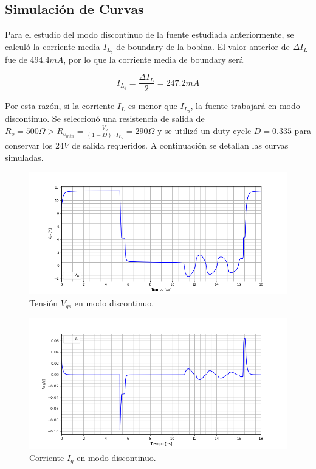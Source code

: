 %

%

\subsection{Simulación de Curvas}

Para el estudio del modo discontinuo de la fuente estudiada anteriormente, se calculó la corriente media $I_{L_b}$ de boundary de la bobina. El valor anterior de $\Delta I_L$ fue de $494.4mA$, por lo que la corriente media de boundary será

\begin{equation}
I_{L_b} = \frac{\Delta I_L}{2} = 247.2mA
\label{ej4:eq:il_boundary}
\end{equation}

Por esta razón, si la corriente $I_L$ es menor que $I_{L_b}$, la fuente trabajará en modo discontinuo. Se seleccionó una resistencia de salida de $R_o = 500\Omega > R_{o_{min}} = \frac{V_o}{(1-D) \cdot I_{L_b}} = 290\Omega$  y se utilizó un duty cycle $D = 0.335$ para conservar los $24V$ de salida requeridos. A continuación se detallan las curvas simuladas.

\begin{figure}[H]
	\centering
	\includegraphics[width=0.85\linewidth]{ImagenesEjercicio-4/vgs}
	\caption{Tensión $V_{gs}$ en modo discontinuo.}
	\label{ej4:fig:vgs}
\end{figure}

\begin{figure}[H]
	\centering
	\includegraphics[width=0.85\linewidth]{ImagenesEjercicio-4/ig}
	\caption{Corriente $I_g$ en modo discontinuo.}
	\label{ej4:fig:ig}
\end{figure}


